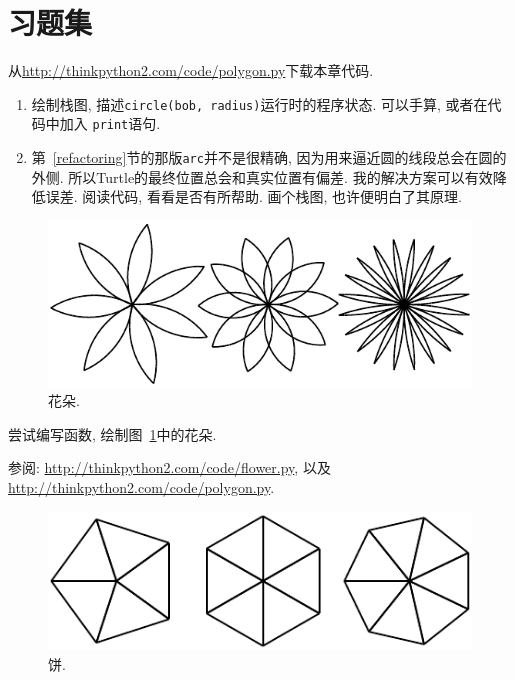 \documentclass[10pt]{book}
\begin{document}
\section{习题集}

\begin{exercise}

从\url{http://thinkpython2.com/code/polygon.py}下载本章代码. 

\begin{enumerate}

\item 绘制栈图, 描述{\tt circle(bob, radius)}运行时的程序状态. 
可以手算, 或者在代码中加入 {\tt print}语句.

\item 第~\ref{refactoring}节的那版{\tt arc}并不是很精确, 
因为用来逼近圆的线段总会在圆的外侧. 
所以Turtle的最终位置总会和真实位置有偏差. 
我的解决方案可以有效降低误差. 阅读代码, 看看是否有所帮助. 
画个栈图, 也许便明白了其原理. 

\end{enumerate}

\end{exercise}

\begin{figure}
\centerline
{\includegraphics[scale=0.8]{figs/flowers.pdf}}
\caption{花朵.}
\label{fig.flowers}
\end{figure}

\begin{exercise}

尝试编写函数, 绘制图~\ref{fig.flowers}中的花朵. 

参阅: \url{http://thinkpython2.com/code/flower.py},
以及 \url{http://thinkpython2.com/code/polygon.py}.

\end{exercise}

\begin{figure}
\centerline
{\includegraphics[scale=0.8]{figs/pies.pdf}}
\caption{饼.}
\label{fig.pies}
\end{figure}
\end{document}
